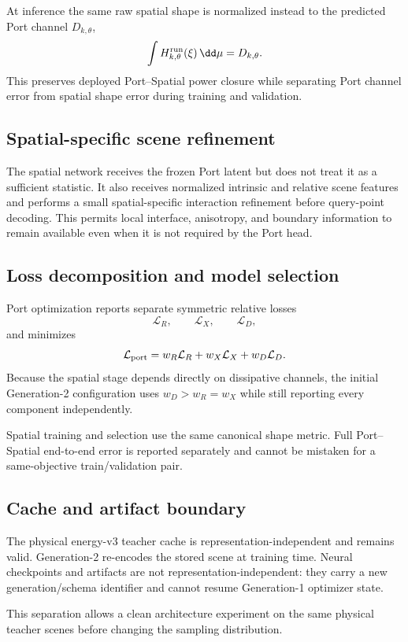 At inference the same raw spatial shape is normalized instead to the predicted
Port channel $D_{k,\theta}$,
\[
 \int H_{k,\theta}^{\rm run}(\xi)\,\dd\mu
 =D_{k,\theta}.
\]
This preserves deployed Port--Spatial power closure while separating Port
channel error from spatial shape error during training and validation.

\subsection{Spatial-specific scene refinement}

The spatial network receives the frozen Port latent but does not treat it as a
sufficient statistic.  It also receives normalized intrinsic and relative scene
features and performs a small spatial-specific interaction refinement before
query-point decoding.  This permits local interface, anisotropy, and boundary
information to remain available even when it is not required by the Port head.

\subsection{Loss decomposition and model selection}

Port optimization reports separate symmetric relative losses
\[
 \mathcal L_R,\qquad
 \mathcal L_X,\qquad
 \mathcal L_D,
\]
and minimizes
\[
 \mathcal L_{\rm port}
 =w_R\mathcal L_R+w_X\mathcal L_X+w_D\mathcal L_D.
\]
Because the spatial stage depends directly on dissipative channels, the initial
Generation-2 configuration uses $w_D>w_R=w_X$ while still reporting every
component independently.

Spatial training and selection use the same canonical shape metric.  Full
Port--Spatial end-to-end error is reported separately and cannot be mistaken
for a same-objective train/validation pair.

\subsection{Cache and artifact boundary}

The physical energy-v3 teacher cache is representation-independent and remains
valid.  Generation-2 re-encodes the stored scene at training time.  Neural
checkpoints and artifacts are not representation-independent: they carry a new
generation/schema identifier and cannot resume Generation-1 optimizer state.

This separation allows a clean architecture experiment on the same physical
teacher scenes before changing the sampling distribution.